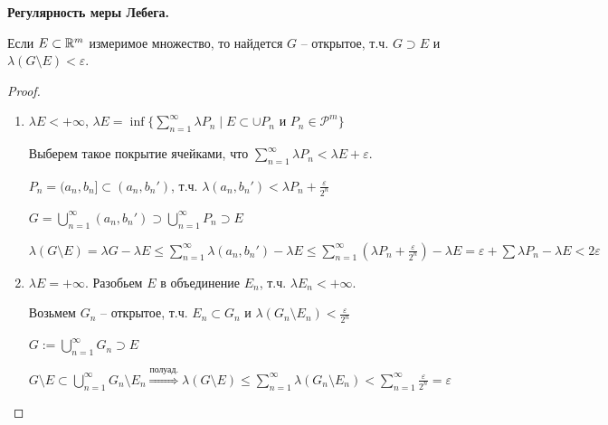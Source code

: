 \begin{theorem}
    \textbf{Регулярность меры Лебега.}

    Если $E\subset \mathbb{R}^m$ измеримое множество, то найдется $G$ – открытое, т.ч. $G\supset E$ и $\lambda (G\setminus E) < \varepsilon$.
\end{theorem}

\begin{proof}~
    \begin{enumerate}
        \item $\lambda E < +\infty$, $\lambda E =\inf \{ \sum\limits_{n=1}^\infty \lambda P_n \mid E\subset \cup P_n\text{ и } P_n\in \mathcal{P}^m\}$
        
        Выберем такое покрытие ячейками, что $\sum\limits_{n=1}^\infty \lambda P_n<\lambda E + \varepsilon$.

        $P_n= (a_n, b_n]\subset (a_n, b_n')$, т.ч. $\lambda (a_n, b_n')< \lambda P_n + \frac{\varepsilon}{2^n}$

        $G=\bigcup\limits_{n=1}^\infty (a_n, b_n')\supset \bigcup\limits_{n=1}^\infty P_n \supset E$

        $\lambda (G\setminus E) = \lambda G - \lambda E \leq \sum\limits_{n=1}^\infty \lambda (a_n, b_n') - \lambda E
        \leq \sum\limits_{n=1}^\infty (\lambda P_n + \frac{\varepsilon}{2^n}) - \lambda E = \varepsilon + \sum \lambda P_n - \lambda E < 2\varepsilon$

        \item $\lambda E = +\infty$. Разобьем $E$ в объединение $E_n$, т.ч. $\lambda E_n <+\infty$.

        Возьмем $G_n$ – открытое, т.ч. $E_n\subset G_n$ и $\lambda (G_n \setminus E_n) < \frac{\varepsilon}{2^n}$

        $G:= \bigcup\limits_{n=1}^\infty G_n \supset E$

        $G\setminus E \subset \bigcup\limits_{n=1}^\infty G_n \setminus E_n\overset{\text{полуад.}}{\Rightarrow} \lambda (G\setminus E)\leq \sum\limits_{n=1}^\infty\lambda (G_n \setminus E_n)< 
        \sum\limits_{n=1}^\infty \frac{\varepsilon}{2^n}=\varepsilon$
    \end{enumerate}
\end{proof}


